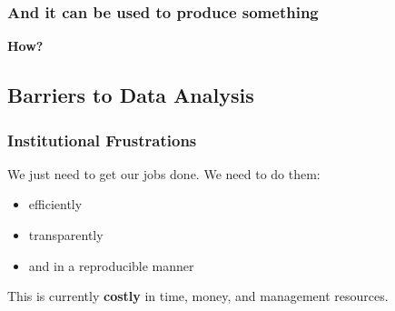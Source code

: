 \documentclass[12pt,handout]{beamer}
\begin{document}
{
\begin{frame}[plain]
\frametitle{And it can be used to produce something}
\end{frame}
}


\begin{frame}
\begin{center}
\Huge \textbf{How?}
\end{center}
\end{frame}

\subsection{Barriers to Data Analysis}

\begin{frame}
\frametitle{Institutional Frustrations}
We just need to get our jobs done. We need to do them:
\begin{itemize}
  \item efficiently
  \item transparently 
  \item and in a reproducible manner
\end{itemize}

This is currently \Large \textbf{costly} \normalsize in time, money, and management resources.
\end{frame}
\end{document}
